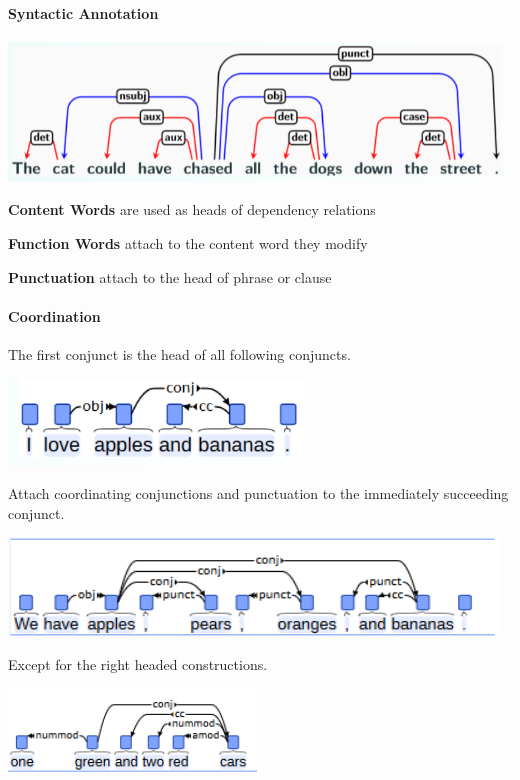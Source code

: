\documentclass[10pt]{report}
\begin{document}
\paragraph{Syntactic Annotation}
\begin{center}
	\includegraphics[scale=0.5]{50.png}
\end{center}
\begin{list}{}{}
	\item \textbf{Content Words} are used as heads of dependency relations
	\item \textbf{Function Words} attach to the content word they modify
	\item \textbf{Punctuation} attach to the head of phrase or clause
\end{list}
\paragraph{Coordination} The first conjunct is the head of all following conjuncts.
\begin{center}
	\includegraphics[scale=0.6]{51.png}
\end{center}
Attach coordinating conjunctions and punctuation to the immediately succeeding conjunct.
\begin{center}
	\includegraphics[scale=0.5]{52.png}
\end{center}
Except for the right headed constructions.
\begin{center}
	\includegraphics[scale=0.75]{53.png}
\end{center}
\end{document}
